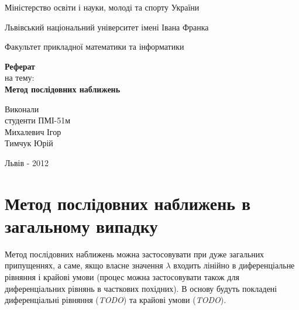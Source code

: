 \documentclass[12pt,a4paper]{article}
\begin{document}

\setlength{\parindent}{1.5cm}
\fontsize{14pt}{6mm}\selectfont

\begin{center}
  Міністерство освіти і науки, молоді та спорту України
  
  Львівський національний університет імені Івана Франка

  Факультет прикладної математики та інформатики
\end{center}


\vspace{6cm}

\begin{center}
  {\bfseries\Large Реферат}\\[0.5cm]
  на тему:\\[0.5cm]
  {\bfseries\Large Метод послідовних наближень}\\
\end{center}

\vspace{2cm}

\begin{flushleft}
  Виконали\\
  студенти ПМІ-51м\\
  Михалевич Ігор\\
  Тимчук Юрій
\end{flushleft}

\vspace{6cm}

\begin{center}
  Львів - 2012 
\end{center}

\clearpage

\fontsize{14pt}{6mm}\selectfont

\section{Метод послідовних наближень в загальному випадку}
Метод послідовних наближень можна застосовувати при дуже загальних припущеннях, а саме, якщо власне значення $\lambda$ входить лінійно в диференціальне рівняння і крайові умови (процес можна застосовувати також для диференціальних рівнянь в часткових похідних). В основу будуть покладені диференціальні рівняння (\emph{TODO}) та крайові умови (\emph{TODO}).
\end{document}
